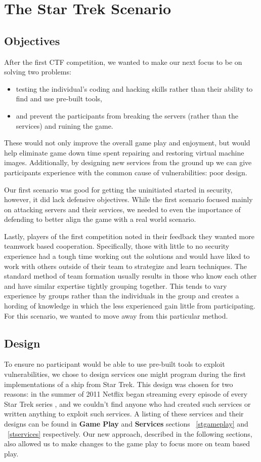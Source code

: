 \documentclass[10pt]{article}
\begin{document}
\section{The Star Trek Scenario}
\label{stscenario}
\subsection{Objectives}
After the first CTF competition, we wanted to make our next focus to be on
solving two problems:
\begin{itemize}
	\item testing the individual's coding and hacking skills rather than their
	ability to find and use pre-built tools,
	\item and prevent the participants from breaking the servers (rather than the
	services) and ruining the game.
\end{itemize}

These would not only improve the overall game play and enjoyment, but would
help eliminate game down time spent repairing and restoring virtual machine
images. Additionally, by designing new services from the ground up we can
give participants experience with the common cause of vulnerabilities: poor
design.

Our first scenario was good for getting the uninitiated started in security,
however, it did lack defensive objectives. While the first scenario focused
mainly on attacking servers and their services, we needed to even the importance
of defending to better align the game with a real world scenario.

Lastly, players of the first competition noted in their feedback they wanted
more teamwork based cooperation. Specifically, those with little to no security
experience had a tough time working out the solutions and would have liked to
work with others outside of their team to strategize and learn techniques. The
standard method of team formation usually results in those who know each other
and have similar expertise tightly grouping together. This tends to vary
experience by groups rather than the individuals in the group and creates a
hording of knowledge in which the less experienced gain little from
participating. For this scenario, we wanted to move away from this particular
method.

\subsection{Design}
\label{stdesign}
To ensure no participant would be able to use pre-built tools to exploit
vulnerabilities, we chose to design services one might program during the first
implementations of a ship from Star Trek. This design was chosen
for two reasons: in the summer of 2011 Netflix began streaming every episode of
every Star Trek series \cite{Netflix}, and we couldn't find anyone who
had created such services or written anything to exploit such services. A
listing of these services and their designs can be found in \textbf{Game Play}
and \textbf{Services} sections ~\ref{stgameplay} and ~\ref{stservices}
respectively. Our new approach, described in the following sections, also
allowed us to make changes to the game play to focus more on team based play.
\end{document}
